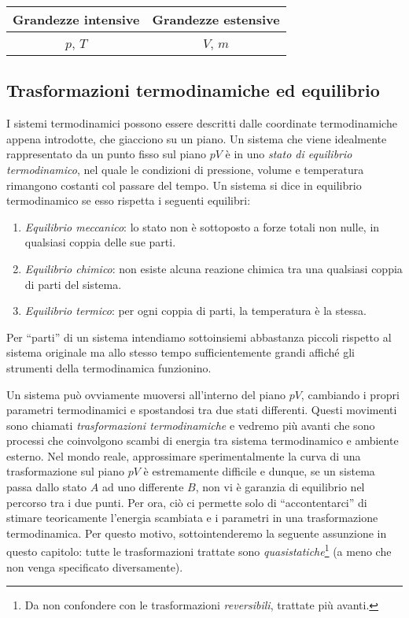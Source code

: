 \begin{center}
    \begin{tabular}{c || c}
        Grandezze intensive & Grandezze estensive\\
        \hline
        $p$, $T$ & $V$, $m$
    \end{tabular}
\end{center}


\subsection{Trasformazioni termodinamiche ed equilibrio}
I sistemi termodinamici possono essere descritti dalle coordinate
termodinamiche appena introdotte, che giacciono su un piano. Un
sistema che viene idealmente rappresentato da un punto fisso sul
piano $pV$ è in uno \textit{stato di equilibrio termodinamico},
nel quale le condizioni di pressione, volume e temperatura rimangono
costanti col passare del tempo.
Un sistema si dice in equilibrio termodinamico se esso rispetta i seguenti equilibri:
\begin{enumerate}
    \item \textit{Equilibrio meccanico}: lo stato non è sottoposto a forze totali non nulle,
    in qualsiasi coppia delle sue parti.

    \item \textit{Equilibrio chimico}: non esiste alcuna reazione chimica tra una qualsiasi
    coppia di parti del sistema.

    \item \textit{Equilibrio termico}: per ogni coppia di parti, la temperatura è la stessa.
\end{enumerate}

\noindent Per ``parti'' di un sistema intendiamo sottoinsiemi
abbastanza piccoli rispetto al sistema originale ma allo stesso
tempo sufficientemente grandi affiché gli strumenti della termodinamica
funzionino.


Un sistema può ovviamente muoversi all'interno del piano $pV$, cambiando
i propri parametri termodinamici e spostandosi tra due stati differenti.
Questi movimenti sono chiamati \textit{trasformazioni termodinamiche} e
vedremo più avanti che sono processi che coinvolgono scambi di energia
tra sistema termodinamico e ambiente esterno. Nel mondo reale, approssimare
sperimentalmente la curva di una trasformazione sul piano $pV$ è
estremamente difficile e dunque, se un sistema passa dallo stato $A$
ad uno differente $B$, non vi è garanzia di equilibrio nel percorso
tra i due punti. Per ora, ciò ci permette solo di ``accontentarci'' di
stimare teoricamente l'energia scambiata e i parametri in una trasformazione
termodinamica. Per questo motivo, sottointenderemo la seguente assunzione
in questo capitolo: tutte le trasformazioni trattate sono \textit{quasistatiche}\footnote{Da non confondere con le trasformazioni \textit{reversibili}, trattate più avanti.}
(a meno che non venga specificato diversamente).


